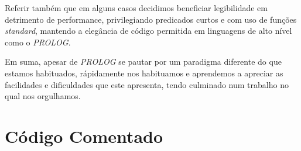 \documentclass[a4paper]{article}
\begin{document}
Referir também que em alguns casos decidimos beneficiar legibilidade em detrimento de performance, privilegiando predicados curtos e com uso de funções \textit{standard}, mantendo a elegância de código permitida em linguagens de alto nível como o \textit{PROLOG}.

Em suma, apesar de \textit{PROLOG} se pautar por um paradigma diferente do que estamos habituados, rápidamente nos habituamos e aprendemos a apreciar as facilidades e dificuldades que este apresenta, tendo culminado num trabalho no qual nos orgulhamos.


\clearpage
{}
\renewcommand\refname{Bibliografia}




\newpage
\appendix
\section{Código Comentado}
\end{document}

